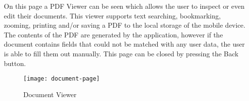 	On this page a PDF Viewer can be seen which allows the user to inspect or even edit their documents.
	This viewer supports text searching, bookmarking, zooming, printing and/or saving a PDF to the local storage of the mobile device.
	The contents of the PDF are generated by the application, however if the document contains fields that could not be matched with any user data,
	the user is able to fill them out manually. This page can be closed by pressing the Back button.

		\begin{figure}[H]
			\centering
			\texttt{[image: document-page]}
			\caption{Document Viewer}
		\end{figure}
